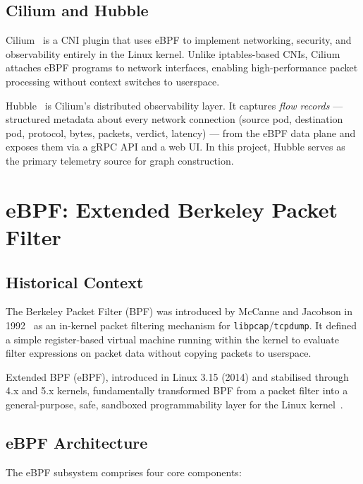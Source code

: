 \subsection{Cilium and Hubble}
Cilium~\cite{cilium} is a CNI plugin that uses eBPF to implement networking, security,
and observability entirely in the Linux kernel. Unlike iptables-based CNIs, Cilium
attaches eBPF programs to network interfaces, enabling high-performance packet processing
without context switches to userspace.

Hubble~\cite{hubble} is Cilium's distributed observability layer. It captures
\emph{flow records} --- structured metadata about every network connection (source pod,
destination pod, protocol, bytes, packets, verdict, latency) --- from the eBPF data plane
and exposes them via a gRPC API and a web UI. In this project, Hubble serves as the
primary telemetry source for graph construction.

\section{eBPF: Extended Berkeley Packet Filter}
\label{sec:bg_ebpf}

\subsection{Historical Context}
The Berkeley Packet Filter (BPF) was introduced by McCanne and Jacobson in 1992~\cite{mccanne1993bpf}
as an in-kernel packet filtering mechanism for \texttt{libpcap}/\texttt{tcpdump}. It
defined a simple register-based virtual machine running within the kernel to evaluate
filter expressions on packet data without copying packets to userspace.

Extended BPF (eBPF), introduced in Linux 3.15 (2014) and stabilised through 4.x and 5.x
kernels, fundamentally transformed BPF from a packet filter into a general-purpose,
safe, sandboxed programmability layer for the Linux kernel~\cite{gregg2019bpf}.

\subsection{eBPF Architecture}
\label{subsec:ebpf_arch}

The eBPF subsystem comprises four core components:

